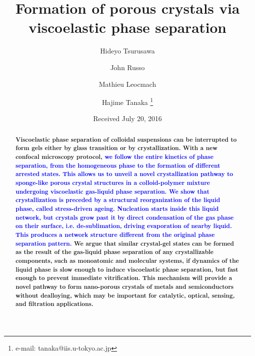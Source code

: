 \documentclass[preprint,amsmath,amssymb,superscriptaddress]{revtex4-1}
\begin{document}


\title{Formation of porous crystals via viscoelastic phase separation} 

\author{Hideyo Tsurusawa} 
\author{John Russo}
\author{Mathieu Leocmach}
\author{Hajime Tanaka  \footnote{e-mail: tanaka@iis.u-tokyo.ac.jp}}

\date{Received July 20, 2016}

\begin{abstract}
{\bf
Viscoelastic phase separation of colloidal suspensions can be interrupted to form gels either by glass transition or by crystallization. With a new confocal microscopy protocol, \textcolor{blue}{we follow the entire kinetics of phase separation, from the homogeneous phase to the formation of different arrested states. This allows us to unveil a novel crystallization pathway to sponge-like porous crystal structures in a colloid-polymer mixture undergoing viscoelastic gas-liquid phase separation. We show that crystallization is preceded by a structural reorganization of the liquid phase, called stress-driven ageing. Nucleation starts inside this liquid network, but crystals grow past it by direct condensation of the gas phase on their surface, i.e. de-sublimation, driving evaporation of nearby liquid. This produces a network structure different from the original phase separation pattern.} We argue that similar crystal-gel states can be formed as the result of the gas-liquid phase separation of any crystallizable components, such as monoatomic and molecular systems, if dynamics of the liquid phase is slow enough to induce viscoelastic phase separation, but fast enough to prevent immediate vitrification. This mechanism will provide a novel pathway to form nano-porous crystals of metals and semiconductors without dealloying, which may be important for catalytic, optical, sensing, and filtration applications. 
}
\end{abstract}
\end{document}
